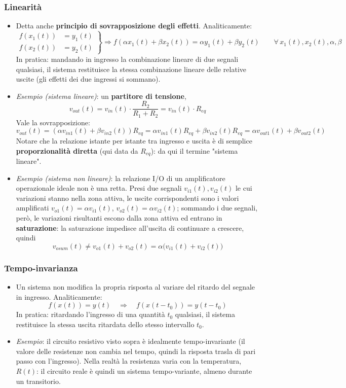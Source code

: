 \documentclass[12pt, a4paper]{article}
\begin{document}
\subsubsection{Linearità}
\begin{itemize}
    \item Detta anche \textbf{principio di sovrapposizione degli effetti}. Analiticamente:
    $$\left.\begin{aligned} f(x_1(t)) &= y_1(t) \\ f(x_2(t)) &= y_2(t)\end{aligned}\right\} \Rightarrow f(\alpha x_1(t) + \beta x_2(t)) = \alpha y_1(t) + \beta y_2(t) \qquad \forall\, x_1(t), x_2(t), \alpha, \beta$$
    In pratica: mandando in ingresso la combinazione lineare di due segnali qualsiasi, il sistema restituisce la stessa combinazione lineare delle relative uscite (gli effetti dei due ingressi si sommano).
    \item \textit{Esempio (sistema lineare)}: un \textbf{partitore di tensione},
    $$v_{out}(t) = v_{in}(t)\cdot\frac{R_2}{R_1+R_2} = v_{in}(t)\cdot R_{eq}$$
    Vale la sovrapposizione:
    $$v_{out}(t) = (\alpha v_{in1}(t)+\beta v_{in2}(t))R_{eq} = \alpha v_{in1}(t)R_{eq}+\beta v_{in2}(t)R_{eq} = \alpha v_{out1}(t)+\beta v_{out2}(t)$$
    Notare che la relazione istante per istante tra ingresso e uscita è di semplice \textbf{proporzionalità diretta} (qui data da $R_{eq}$): da qui il termine "sistema lineare".
    \item \textit{Esempio (sistema non lineare)}: la relazione I/O di un amplificatore operazionale ideale non è una retta. Presi due segnali $v_{i1}(t), v_{i2}(t)$ le cui variazioni stanno nella zona attiva, le uscite corrispondenti sono i valori amplificati $v_{o1}(t)=\alpha v_{i1}(t)$, $v_{o2}(t)=\alpha v_{i2}(t)$; sommando i due segnali, però, le variazioni risultanti escono dalla zona attiva ed entrano in \textbf{saturazione}: la saturazione impedisce all'uscita di continuare a crescere, quindi
    $$v_{osum}(t) \ne v_{o1}(t)+v_{o2}(t) = \alpha\big(v_{i1}(t)+v_{i2}(t)\big)$$
\end{itemize}

\subsubsection{Tempo-invarianza}
\begin{itemize}
    \item Un sistema non modifica la propria risposta al variare del ritardo del segnale in ingresso. Analiticamente:
    $$f(x(t)) = y(t) \quad\Rightarrow\quad f(x(t-t_0)) = y(t-t_0)$$
    In pratica: ritardando l'ingresso di una quantità $t_0$ qualsiasi, il sistema restituisce la stessa uscita ritardata dello stesso intervallo $t_0$.
    \item \textit{Esempio}: il circuito resistivo visto sopra è idealmente tempo-invariante (il valore delle resistenze non cambia nel tempo, quindi la risposta trasla di pari passo con l'ingresso). Nella realtà la resistenza varia con la temperatura, $R(t)$: il circuito reale è quindi un sistema tempo-variante, almeno durante un transitorio.
\end{itemize}
\end{document}
